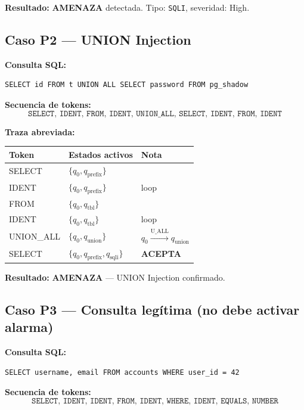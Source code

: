 \documentclass[12pt, a4paper]{report}
\theoremstyle{definition}
\theoremstyle{remark}
\newcommand{\severity}[2]{\textbf{\color{#1}#2}}
\begin{document}
\textbf{Resultado:} \severity{danger}{AMENAZA} detectada. Tipo: \texttt{SQLI}, severidad: High.

\subsection{Caso P2 — UNION Injection}

\textbf{Consulta SQL:}
\begin{lstlisting}[style=json, numbers=none]
SELECT id FROM t UNION ALL SELECT password FROM pg_shadow
\end{lstlisting}

\textbf{Secuencia de tokens:}
\[
  \texttt{SELECT, IDENT, FROM, IDENT, UNION\_ALL, SELECT, IDENT, FROM, IDENT}
\]

\textbf{Traza abreviada:}
\begin{center}
\begin{tabular}{lll}
  \toprule
  \textbf{Token} & \textbf{Estados activos} & \textbf{Nota} \\
  \midrule
  SELECT    & $\{q_0, q_{\text{prefix}}\}$ & \\
  IDENT     & $\{q_0, q_{\text{prefix}}\}$ & loop \\
  FROM      & $\{q_0, q_{\text{tbl}}\}$    & \\
  IDENT     & $\{q_0, q_{\text{tbl}}\}$    & loop \\
  UNION\_ALL& $\{q_0, q_{\text{union}}\}$  & $q_0 \xrightarrow{\text{U\_ALL}} q_{\text{union}}$ \\
  SELECT    & $\{q_0, q_{\text{prefix}}, q_{\text{sqli}}\}$ & \textbf{ACEPTA} \\
  \bottomrule
\end{tabular}
\end{center}

\textbf{Resultado:} \severity{danger}{AMENAZA} — UNION Injection confirmado.

\subsection{Caso P3 — Consulta legítima (no debe activar alarma)}

\textbf{Consulta SQL:}
\begin{lstlisting}[style=json, numbers=none]
SELECT username, email FROM accounts WHERE user_id = 42
\end{lstlisting}

\textbf{Secuencia de tokens:}
\[
  \texttt{SELECT, IDENT, IDENT, FROM, IDENT, WHERE, IDENT, EQUALS, NUMBER}
\]
\end{document}
